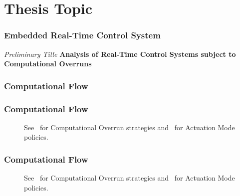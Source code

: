 \section{Thesis Topic}%

\begin{frame}
    \frametitle{Embedded Real-Time Control System}
    \emph{Preliminary Title}\newline
    \textbf{Analysis of Real-Time Control Systems subject to Computational Overruns}
    \begin{figure}[h]
        \centering
        \only<2>{}%
        \only<3>{}%
    \end{figure}
\end{frame}

\begin{frame}
    \frametitle{Computational Flow}
    \begin{figure}[h]
        \centering
    \end{figure}
\end{frame}

\begin{frame}
    \frametitle{Computational Flow}
    \begin{figure}[h]
        \centering
        \caption{See~\cite{Cervin:2005} for Computational Overrun strategies and~\cite{Schenato:2009} for Actuation Mode policies.}
    \end{figure}
\end{frame}

\begin{frame}
    \frametitle{Computational Flow}
    \begin{figure}[h]
        \centering
        \caption{See~\cite{Cervin:2005} for Computational Overrun strategies and~\cite{Schenato:2009} for Actuation Mode policies.}
    \end{figure}
\end{frame}

